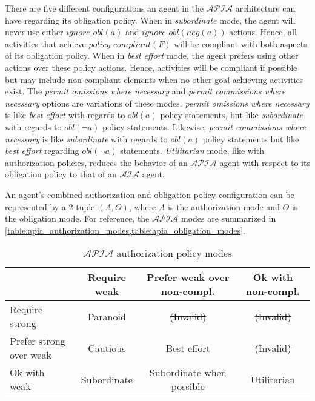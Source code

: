 There are five different configurations an agent in the $\mathcal{APIA}$ architecture can have regarding its obligation policy.
When in \textit{subordinate} mode, the agent will never use either $ignore\_obl(a)$ and $ignore\_obl(neg(a))$ actions.
Hence, all activities that achieve $policy\_compliant(F)$ will be compliant with both aspects of its obligation policy.
When in \textit{best effort} mode, the agent prefers using other actions over these policy actions.
Hence, activities will be compliant if possible but may include non-compliant elements when no other goal-achieving activities exist.
The \textit{permit omissions where necessary} and \textit{permit commissions where necessary} options are variations of these modes.
\textit{permit omissions where necessary} is like \textit{best effort} with regards to $obl(a)$ policy statements, but like \textit{subordinate} with regards to $obl(\neg a)$ policy statements.
Likewise, \textit{permit commissions where necessary} is like \textit{subordinate} with regards to $obl(a)$ policy statements but like \textit{best effort} regarding $obl(\neg a)$ statements.
\textit{Utilitarian} mode, like with authorization policies, reduces the behavior of an $\mathcal{APIA}$ agent with respect to its obligation policy to that of an $\mathcal{AIA}$ agent.

An agent's combined authorization and obligation policy configuration can be represented by a 2-tuple $(A, O)$, where $A$ is the authorization mode and $O$ is the obligation mode.
For reference, the $\mathcal{APIA}$ modes are summarized in \cref{table:apia_authorization_modes,table:apia_obligation_modes}.

\begin{table}[h]
    \centering
    \begin{tabular}{ | l | c | c | c | }
        \hline
        & Require weak & Prefer weak over non-compl. & Ok with non-compl. \\
        \hline
        Require strong & Paranoid & \sout{(Invalid)} & \sout{(Invalid)} \\
        \hline
        Prefer strong over weak & Cautious & Best effort & \sout{(Invalid)} \\
        \hline
        Ok with weak & Subordinate & Subordinate when possible & Utilitarian \\
        \hline
    \end{tabular}
    \caption{$\mathcal{APIA}$ authorization policy modes}
    \label{table:apia_authorization_modes}
\end{table}

